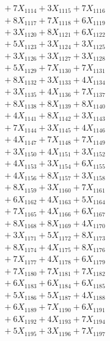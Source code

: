 \documentclass[a4paper,10pt]{article}
\begin{document}
{\begin{align}
&\;  + 7 X_{1114} + 3 X_{1115} + 7 X_{1116} \\[0.3ex]
&\;  + 8 X_{1117} + 7 X_{1118} + 6 X_{1119} \\[0.5ex]\allowbreak
&\;  + 3 X_{1120} + 8 X_{1121} + 6 X_{1122} \\[0.3ex]
&\;  + 5 X_{1123} + 3 X_{1124} + 3 X_{1125} \\[0.3ex]
&\;  + 3 X_{1126} + 3 X_{1127} + 3 X_{1128} \\[0.3ex]
&\;  + 5 X_{1129} + 7 X_{1130} + 7 X_{1131} \\[0.3ex]
&\;  + 8 X_{1132} + 3 X_{1133} + 4 X_{1134} \\[0.3ex]
&\;  + 3 X_{1135} + 4 X_{1136} + 7 X_{1137} \\[0.3ex]
&\;  + 8 X_{1138} + 8 X_{1139} + 8 X_{1140} \\[0.3ex]
&\;  + 4 X_{1141} + 8 X_{1142} + 3 X_{1143} \\[0.3ex]
&\;  + 7 X_{1144} + 3 X_{1145} + 4 X_{1146} \\[0.3ex]
&\;  + 4 X_{1147} + 7 X_{1148} + 7 X_{1149} \\[0.5ex]\allowbreak
&\;  + 3 X_{1150} + 4 X_{1151} + 3 X_{1152} \\[0.3ex]
&\;  + 4 X_{1153} + 3 X_{1154} + 6 X_{1155} \\[0.3ex]
&\;  + 4 X_{1156} + 8 X_{1157} + 3 X_{1158} \\[0.3ex]
&\;  + 8 X_{1159} + 3 X_{1160} + 7 X_{1161} \\[0.3ex]
&\;  + 6 X_{1162} + 4 X_{1163} + 5 X_{1164} \\[0.3ex]
&\;  + 7 X_{1165} + 4 X_{1166} + 6 X_{1167} \\[0.3ex]
&\;  + 8 X_{1168} + 8 X_{1169} + 4 X_{1170} \\[0.3ex]
&\;  + 3 X_{1171} + 5 X_{1172} + 8 X_{1173} \\[0.3ex]
&\;  + 8 X_{1174} + 4 X_{1175} + 8 X_{1176} \\[0.3ex]
&\;  + 7 X_{1177} + 4 X_{1178} + 6 X_{1179} \\[0.5ex]\allowbreak
&\;  + 7 X_{1180} + 7 X_{1181} + 7 X_{1182} \\[0.3ex]
&\;  + 6 X_{1183} + 6 X_{1184} + 6 X_{1185} \\[0.3ex]
&\;  + 5 X_{1186} + 5 X_{1187} + 4 X_{1188} \\[0.3ex]
&\;  + 6 X_{1189} + 7 X_{1190} + 6 X_{1191} \\[0.3ex]
&\;  + 6 X_{1192} + 4 X_{1193} + 7 X_{1194} \\[0.3ex]
&\;  + 5 X_{1195} + 3 X_{1196} + 7 X_{1197} \\[0.3ex]

\end{align}}
\end{document}
